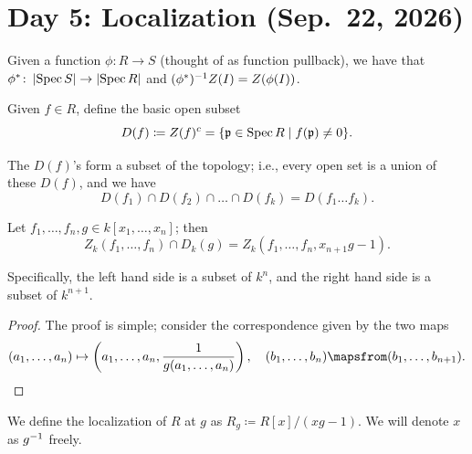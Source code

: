 \section{Day 5: Localization (Sep.\ 22, 2026)}
Given a function $\phi \colon R \to S$ (thought of as function pullback), we have that $\phi^\ast \colon \left\lvert \operatorname{Spec} S \right\rvert \to \left\lvert \operatorname{Spec} R \right\rvert$ and $(\phi^\ast)^{-1} Z(I) = Z(\phi(I))$.

\begin{definition} \label{defn:basic_open_set}
    Given $f \in R$, define the basic open subset
    \[ D(f) \coloneq Z(f)^c = \{\mathfrak p \in \operatorname{Spec} R \mid f(\mathfrak p) \neq 0\}. \]
\end{definition}
The $D(f)$'s form a subset of the topology; i.e., every open set is a union of these $D(f)$, and we have
\[ D(f_1) \cap D(f_2) \cap \dots \cap D(f_k) = D(f_1 \dots f_k). \]
\vspace{-20pt}
\begin{theorem}[Rabinowitsch] \label{thm:rabinowitsch}
    Let $f_1, \dots, f_n, g \in k[x_1, \dots, x_n]$; then
    \[ Z_k(f_1, \dots, f_n) \cap D_k(g) = Z_k(f_1, \dots, f_n, x_{n+1} g - 1). \]
\end{theorem}
Specifically, the left hand side is a subset of $k^n$, and the right hand side is a subset of $k^{n+1}$.
\begin{proof}
    The proof is simple; consider the correspondence given by the two maps
    \[ (a_1, \dots, a_n) \mapsto \left(a_1, \dots, a_n, \frac{1}{g(a_1, \dots, a_n)}\right), \quad (b_1, \dots, b_n) \mapsfrom (b_1, \dots, b_{n+1}). \qedhere \]
\end{proof}

\begin{definition} \label{defn:localization}
    We define the localization of $R$ at $g$ as $R_g \coloneq R[x]/(xg - 1)$. We will denote $x$ as $g^{-1}$ freely.
\end{definition}

